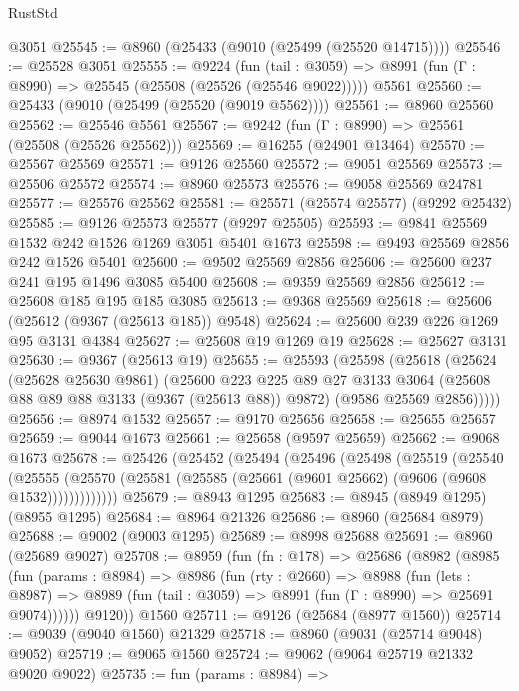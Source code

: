 \begin{lexlean}{RustStd}
\begin{coremodule}
    @3051
@25545 := @8960 (@25433 (@9010 (@25499 (@25520 @14715))))
@25546 := @25528 @3051
@25555 := @9224
    (fun (tail : @3059) => @8991 (fun (Γ : @8990) => @25545 (@25508 (@25526 (@25546 @9022)))))
    @5561
@25560 := @25433 (@9010 (@25499 (@25520 (@9019 @5562))))
@25561 := @8960 @25560
@25562 := @25546 @5561
@25567 := @9242 (fun (Γ : @8990) => @25561 (@25508 (@25526 @25562)))
@25569 := @16255 (@24901 @13464)
@25570 := @25567 @25569
@25571 := @9126 @25560
@25572 := @9051 @25569
@25573 := @25506 @25572
@25574 := @8960 @25573
@25576 := @9058 @25569 @24781
@25577 := @25576 @25562
@25581 := @25571 (@25574 @25577) (@9292 @25432)
@25585 := @9126 @25573 @25577 (@9297 @25505)
@25593 := @9841 @25569 @1532 @242 @1526 @1269 @3051 @5401 @1673
@25598 := @9493 @25569 @2856 @242 @1526 @5401
@25600 := @9502 @25569 @2856
@25606 := @25600 @237 @241 @195 @1496 @3085 @5400
@25608 := @9359 @25569 @2856
@25612 := @25608 @185 @195 @185 @3085
@25613 := @9368 @25569
@25618 := @25606 (@25612 (@9367 (@25613 @185)) @9548)
@25624 := @25600 @239 @226 @1269 @95 @3131 @4384
@25627 := @25608 @19 @1269 @19
@25628 := @25627 @3131
@25630 := @9367 (@25613 @19)
@25655 := @25593
    (@25598
      (@25618
        (@25624
          (@25628 @25630 @9861)
          (@25600
            @223
            @225
            @89
            @27
            @3133
            @3064
            (@25608 @88 @89 @88 @3133 (@9367 (@25613 @88)) @9872)
            (@9586 @25569 @2856)))))
@25656 := @8974 @1532
@25657 := @9170 @25656
@25658 := @25655 @25657
@25659 := @9044 @1673
@25661 := @25658 (@9597 @25659)
@25662 := @9068 @1673
@25678 := @25426
    (@25452
      (@25494
        (@25496
          (@25498
            (@25519
              (@25540
                (@25555
                  (@25570 (@25581 (@25585 (@25661 (@9601 @25662) (@9606 (@9608 @1532)))))))))))))
@25679 := @8943 @1295
@25683 := @8945 (@8949 @1295) (@8955 @1295)
@25684 := @8964 @21326
@25686 := @8960 (@25684 @8979)
@25688 := @9002 (@9003 @1295)
@25689 := @8998 @25688
@25691 := @8960 (@25689 @9027)
@25708 := @8959
    (fun (fn : @178) =>
    @25686
      (@8982
        (@8985
          (fun (params : @8984) =>
          @8986
            (fun (rty : @2660) =>
            @8988
              (fun (lets : @8987) =>
              @8989 (fun (tail : @3059) => @8991 (fun (Γ : @8990) => @25691 @9074))))))
        @9120))
    @1560
@25711 := @9126 (@25684 (@8977 @1560))
@25714 := @9039 (@9040 @1560) @21329
@25718 := @8960 (@9031 (@25714 @9048) @9052)
@25719 := @9065 @1560
@25724 := @9062 (@9064 @25719 @21332 @9020 @9022)
@25735 := fun (params : @8984) =>

\end{coremodule}
\end{lexlean}
